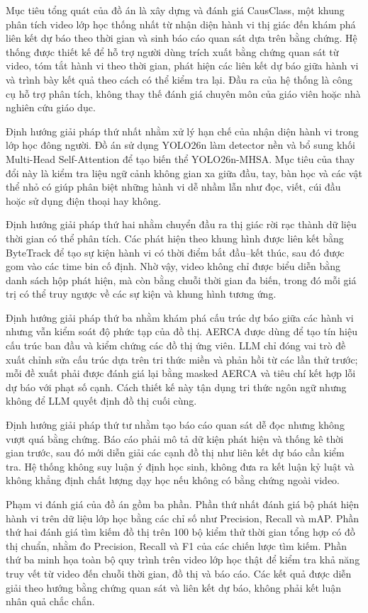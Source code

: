 Mục tiêu tổng quát của đồ án là xây dựng và đánh giá CausClass, một khung phân tích video lớp học thống nhất từ nhận diện hành vi thị giác đến khám phá liên kết dự báo theo thời gian và sinh báo cáo quan sát dựa trên bằng chứng. Hệ thống được thiết kế để hỗ trợ người dùng trích xuất bằng chứng quan sát từ video, tóm tắt hành vi theo thời gian, phát hiện các liên kết dự báo giữa hành vi và trình bày kết quả theo cách có thể kiểm tra lại. Đầu ra của hệ thống là công cụ hỗ trợ phân tích, không thay thế đánh giá chuyên môn của giáo viên hoặc nhà nghiên cứu giáo dục.

Định hướng giải pháp thứ nhất nhằm xử lý hạn chế của nhận diện hành vi trong lớp học đông người. Đồ án sử dụng YOLO26n làm detector nền và bổ sung khối Multi-Head Self-Attention để tạo biến thể YOLO26n-MHSA. Mục tiêu của thay đổi này là kiểm tra liệu ngữ cảnh không gian xa giữa đầu, tay, bàn học và các vật thể nhỏ có giúp phân biệt những hành vi dễ nhầm lẫn như đọc, viết, cúi đầu hoặc sử dụng điện thoại hay không.

Định hướng giải pháp thứ hai nhằm chuyển đầu ra thị giác rời rạc thành dữ liệu thời gian có thể phân tích. Các phát hiện theo khung hình được liên kết bằng ByteTrack để tạo sự kiện hành vi có thời điểm bắt đầu--kết thúc, sau đó được gom vào các time bin cố định. Nhờ vậy, video không chỉ được biểu diễn bằng danh sách hộp phát hiện, mà còn bằng chuỗi thời gian đa biến, trong đó mỗi giá trị có thể truy ngược về các sự kiện và khung hình tương ứng.

Định hướng giải pháp thứ ba nhằm khám phá cấu trúc dự báo giữa các hành vi nhưng vẫn kiểm soát độ phức tạp của đồ thị. AERCA được dùng để tạo tín hiệu cấu trúc ban đầu và kiểm chứng các đồ thị ứng viên. LLM chỉ đóng vai trò đề xuất chỉnh sửa cấu trúc dựa trên tri thức miền và phản hồi từ các lần thử trước; mỗi đề xuất phải được đánh giá lại bằng masked AERCA và tiêu chí kết hợp lỗi dự báo với phạt số cạnh. Cách thiết kế này tận dụng tri thức ngôn ngữ nhưng không để LLM quyết định đồ thị cuối cùng.

Định hướng giải pháp thứ tư nhằm tạo báo cáo quan sát dễ đọc nhưng không vượt quá bằng chứng. Báo cáo phải mô tả dữ kiện phát hiện và thống kê thời gian trước, sau đó mới diễn giải các cạnh đồ thị như liên kết dự báo cần kiểm tra. Hệ thống không suy luận ý định học sinh, không đưa ra kết luận kỷ luật và không khẳng định chất lượng dạy học nếu không có bằng chứng ngoài video.

Phạm vi đánh giá của đồ án gồm ba phần. Phần thứ nhất đánh giá bộ phát hiện hành vi trên dữ liệu lớp học bằng các chỉ số như Precision, Recall và mAP. Phần thứ hai đánh giá tìm kiếm đồ thị trên 100 bộ kiểm thử thời gian tổng hợp có đồ thị chuẩn, nhằm đo Precision, Recall và F1 của các chiến lược tìm kiếm. Phần thứ ba minh họa toàn bộ quy trình trên video lớp học thật để kiểm tra khả năng truy vết từ video đến chuỗi thời gian, đồ thị và báo cáo. Các kết quả được diễn giải theo hướng bằng chứng quan sát và liên kết dự báo, không phải kết luận nhân quả chắc chắn.